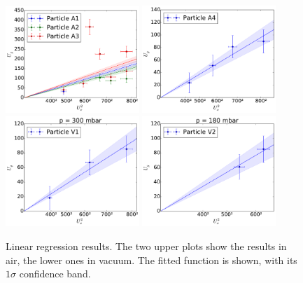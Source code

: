 \documentclass[
	paper=A4,
	parskip=full,
	chapterprefix=true,
	11pt,
	headings=normal,
	bibliography=totoc,
	listof=totoc,
	titlepage=on,
]{scrreprt}
\begin{document}
\begin{figure}
	\centering
	\includegraphics[width=0.45\textwidth]{stability_air_1}
	\includegraphics[width=0.45\textwidth]{stability_air_2} \\
	\includegraphics[width=0.45\textwidth]{stability_vacuum_1} 
	\includegraphics[width=0.45\textwidth]{stability_vacuum_2} \\
	\caption{Linear regression results. The two upper plots show the results in air, the lower ones in vacuum. The fitted function is shown, with its $1 \sigma$ confidence band.}
	\label{fig:stability_linregs}
\end{figure}
\end{document}

